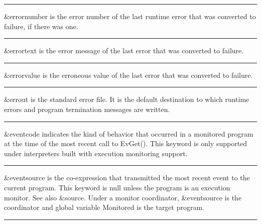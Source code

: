 \bigskip\hrule\vspace{0.1cm}

\noindent
\textsf{\&errornumber} is the error number of the last runtime error
that was converted to failure, if there was one.

\bigskip\hrule\vspace{0.1cm}

\noindent
{}\textsf{\&errortext} is the error
message of the last error that was converted to failure.

\bigskip\hrule\vspace{0.1cm}

\noindent
\textsf{\&errorvalue} is the erroneous value of the last error that was
converted to failure.

\bigskip\hrule\vspace{0.1cm}

\noindent
{}\textsf{\&errout} is the standard
error file. It is the default destination to which runtime errors and
program termination messages are written.

\bigskip\hrule\vspace{0.1cm}

\noindent
{}\textsf{\&eventcode} indicates the
kind of behavior that occurred in a monitored program at the time of
the most recent call to \textsf{EvGet()}. This keyword is only
supported under interpreters built with execution monitoring support.

\bigskip\hrule\vspace{0.1cm}

\noindent
\textsf{\&eventsource} is the co-expression that transmitted the most
recent event to the current program. This keyword is null unless the
program is an execution monitor. See also \textsf{\&source}. Under a
monitor coordinator, \textsf{\&eventsource} is the coordinator and
global variable Monitored is the target program.

\bigskip\hrule\vspace{0.1cm}

